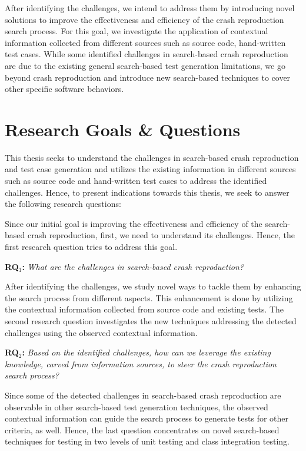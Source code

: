 After identifying the challenges, we intend to address them by introducing novel solutions to improve the effectiveness and efficiency of the crash reproduction search process. For this goal, we investigate the application of contextual information collected from different sources such as source code, hand-written test cases. While some identified challenges in search-based crash reproduction are due to the existing general search-based test generation limitations, we go beyond crash reproduction and introduce new search-based techniques to cover other specific software behaviors.

\section{Research Goals \& Questions}
This thesis seeks to understand the challenges in search-based crash reproduction and test case generation and utilizes the existing information in different sources such as source code and hand-written test cases to address the identified challenges.
Hence, to present indications towards this thesis, we seek to answer the following research questions:

Since our initial goal is improving the effectiveness and efficiency of the search-based crash reproduction, first, we need to understand its challenges. Hence, the first research question tries to address this goal.
\begin{framed}
\quad\textbf{RQ$_1$: } \textit{What are the challenges in search-based crash reproduction?}
\end{framed}

After identifying the challenges, we study novel ways to tackle them by enhancing the search process from different aspects. This enhancement is done by utilizing the contextual information collected from source code and existing tests. The second research question investigates the new techniques addressing the detected challenges using the observed contextual information.


\begin{framed}
    
    \textbf{RQ$_2$: } \textit{Based on the identified challenges, how can we leverage the existing knowledge, carved from information sources, to steer the crash reproduction search process?}

\end{framed}

Since some of the detected challenges in search-based crash reproduction are observable in other search-based test generation techniques, the observed contextual information can guide the search process to generate tests for other criteria, as well. Hence, the last question concentrates on novel search-based techniques for testing in two levels of unit testing and class integration testing.

